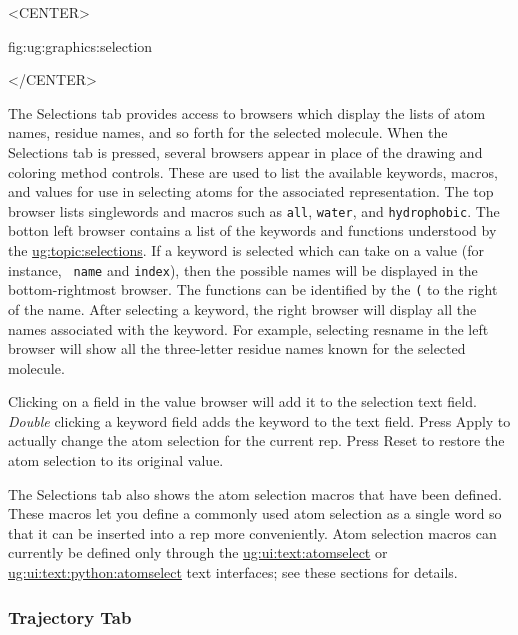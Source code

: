 \begin{rawhtml}
<CENTER>
\end{rawhtml}
{fig:ug:graphics:selection}
\begin{rawhtml}
</CENTER>
\end{rawhtml}

The {\sf Selections} tab 
provides access to
browsers which display the lists of atom names, residue names, and so
forth for the selected molecule.
When the {\sf Selections} tab is pressed, several browsers
appear in place of the drawing and coloring method controls.  
These are used to list the available keywords, macros, and values for use in 
selecting atoms for the associated representation.
The top browser lists singlewords and macros such as {\tt all}, {\tt water},
and {\tt hydrophobic}. 
The botton left browser contains a list of the keywords and functions
understood by the
\hyperref{selection command}{selection command [\S}{]}{ug:topic:selections}.
If a keyword is selected which can take on a value (for instance, {\tt
name} and {\tt index}), then the possible names will be displayed in
the bottom-rightmost browser.  The functions can be
identified by the {\tt (} to the right of the name.  After selecting a
keyword, the right browser will display all the names associated with the
keyword.  For example, selecting {\sf resname} in the left browser will show
all the three-letter residue names known for the selected molecule.

Clicking on a field in the value browser will add it to the selection
text field.  {\it Double} clicking a keyword field adds the keyword
to the text field.  Press {\sf Apply} to actually change the atom selection
for the current rep.  Press {\sf Reset} to restore the atom selection to
its original value.

The {\sf Selections} tab also shows the atom selection macros that have
been defined.  These macros let you define a commonly used atom selection
as a single word so that it can be inserted into a rep more
conveniently.  Atom selection macros can currently be defined only through the 
\hyperref{Tcl}{Tcl [\S}{]}{ug:ui:text:atomselect} or
\hyperref{Python}{Python [\S}{]}{ug:ui:text:python:atomselect}
text interfaces; see these sections for details.


\subsubsection{Trajectory Tab}

